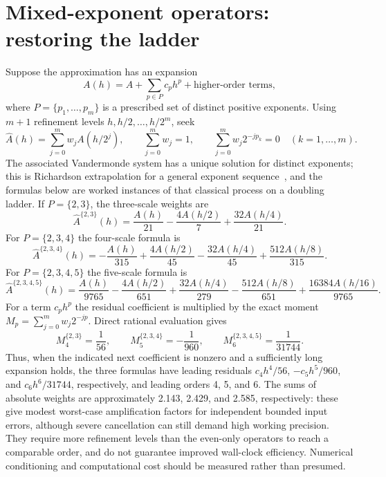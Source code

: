 \documentclass[11pt]{article}
\theoremstyle{remark}
\newcommand{\Ahat}{\widehat{A}}
\begin{document}
\section{Mixed-exponent operators: restoring the ladder}\label{sec:general}
Suppose the approximation has an expansion
\[
A(h)=A+\sum_{p\in P}c_ph^p+\text{higher-order terms},
\]
where $P=\{p_1,\dots,p_m\}$ is a prescribed set of distinct positive exponents. Using $m+1$
refinement levels $h,h/2,\dots,h/2^m$, seek
\begin{equation}\label{eq:gen}
\Ahat(h)=\sum_{j=0}^{m}w_jA(h/2^j),\qquad
\sum_{j=0}^{m}w_j=1,\qquad
\sum_{j=0}^{m}w_j2^{-jp_k}=0\quad(k=1,\dots,m).
\end{equation}
The associated Vandermonde system has a unique solution for distinct exponents; this is
Richardson extrapolation for a general exponent sequence~\cite{bulirschstoer,sidi}, and the
formulas below are worked instances of that classical process on a doubling ladder. If $P=\{2,3\}$, the three-scale
weights are
\begin{equation}\label{eq:P23}
\Ahat^{\{2,3\}}(h)=\frac{A(h)}{21}-\frac{4A(h/2)}{7}+\frac{32A(h/4)}{21}.
\end{equation}
For $P=\{2,3,4\}$ the four-scale formula is
\begin{equation}\label{eq:P234}
\Ahat^{\{2,3,4\}}(h)=-\frac{A(h)}{315}+\frac{4A(h/2)}{45}-\frac{32A(h/4)}{45}+\frac{512A(h/8)}{315}.
\end{equation}
For $P=\{2,3,4,5\}$ the five-scale formula is
\begin{equation}\label{eq:P2345}
\Ahat^{\{2,3,4,5\}}(h)=\frac{A(h)}{9765}-\frac{4A(h/2)}{651}+\frac{32A(h/4)}{279}
-\frac{512A(h/8)}{651}+\frac{16384A(h/16)}{9765}.
\end{equation}
For a term $c_ph^p$ the residual coefficient is multiplied by the exact moment
$M_p=\sum_{j=0}^{m}w_j2^{-jp}$. Direct rational evaluation gives
\begin{equation}\label{eq:moments}
M^{\{2,3\}}_4=\frac1{56},\qquad M^{\{2,3,4\}}_5=-\frac1{960},\qquad M^{\{2,3,4,5\}}_6=\frac1{31744}.
\end{equation}
Thus, when the indicated next coefficient is nonzero and a sufficiently long expansion holds,
the three formulas have leading residuals $c_4h^4/56$, $-c_5h^5/960$, and $c_6h^6/31744$,
respectively, and leading orders 4, 5, and 6. The sums of absolute weights are approximately
2.143, 2.429, and 2.585, respectively: these give modest worst-case amplification factors for
independent bounded input errors, although severe cancellation can still demand high working
precision. They require more refinement levels than the even-only operators to reach a
comparable order, and do not guarantee improved wall-clock efficiency. Numerical conditioning
and computational cost should be measured rather than presumed.
\end{document}
